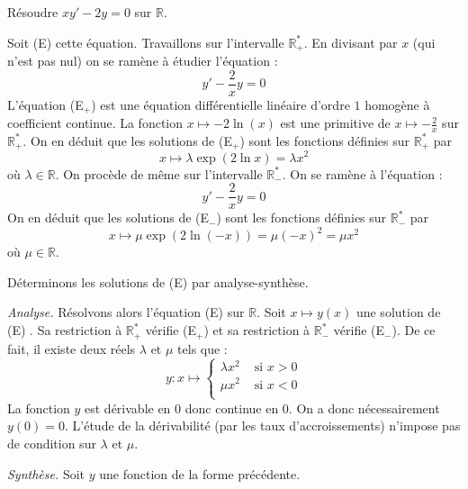 \documentclass[a4paper,10pt]{report}
\begin{document}
\begin{Exercice}{} Résoudre $xy' -2y = 0$ sur $\mathbb{R}$.
\end{Exercice} 

\corr Soit (E) cette équation. Travaillons sur l'intervalle $\mathbb R_+^*$. En divisant par $x$ (qui n'est pas nul) on se ramène à étudier l'équation :
\begin{equation}
\tag{E$_+$}
y'  -\dfrac{2}{x}y = 0
\end{equation}
L'équation (E$_+$) est une équation différentielle  linéaire d'ordre $1$ homogène à coefficient continue. La fonction $x \mapsto -2\ln( x)$ est une primitive de $x \mapsto - \frac{2}{x}$ sur $\mathbb R_+^*$. On en déduit que les solutions de (E$_+$) sont les fonctions définies sur $\mathbb R_+^*$ par 
$$x \mapsto \lambda\exp(2\ln x) = \lambda x^2$$
où $\lambda \in \mathbb R$. On procède de même sur l'intervalle $\mathbb R_-^*$. On se ramène à l'équation :
\begin{equation}
\tag{E$_-$}
y'  -\dfrac{2}{x}y  = 0
\end{equation}
On en déduit que les solutions de (E$_-$) sont les fonctions définies sur $\mathbb R_-^*$ par 
$$x \mapsto \mu\exp(2\ln (-x)) = \mu(-x)^2 = \mu x^2$$
où $\mu \in \mathbb R$.

\noindent Déterminons les solutions de (E) par analyse-synthèse.

\medskip

\noindent \textit{Analyse.} Résolvons alors l'équation (E) sur $\mathbb R$. Soit $x \mapsto y(x)$ une solution de (E) . Sa restriction à $\mathbb R_+^*$ vérifie (E$_+$) et sa restriction à $\mathbb R_-^*$ vérifie (E$_-$). De ce fait, il existe deux réels $\lambda$ et $\mu$ tels que :
$$y : x \mapsto \left\{\begin{array}{ll} \lambda x^2 & \text{ si } x > 0 \\ \mu x^2 & \text{ si } x < 0\\\end{array} \right.$$
La fonction $y$ est dérivable en $0$ donc continue en $0$. On a donc nécessairement $y(0)=0$. L'étude de la dérivabilité (par les taux d'accroissements) n'impose pas de condition sur $\lambda$ et $\mu$.

\medskip

\noindent \textit{Synthèse.} Soit $y$ une fonction de la forme précédente.
\end{document}
